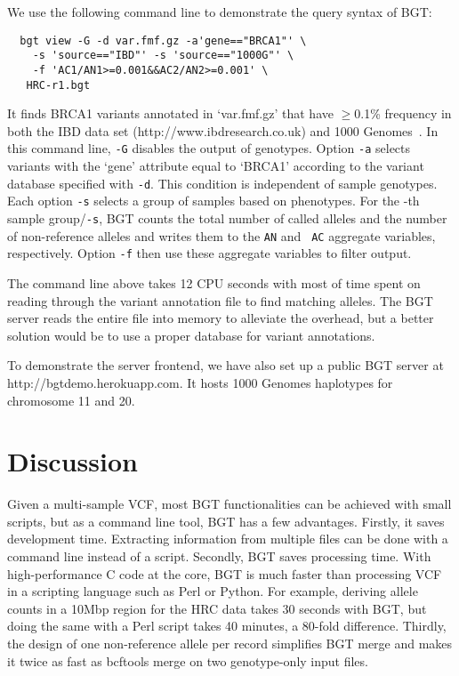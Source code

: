 \documentclass{bioinfo}
\begin{document}
We use the following command line to demonstrate the query syntax of BGT:
\begin{center}\footnotesize
\begin{verbatim}
  bgt view -G -d var.fmf.gz -a'gene=="BRCA1"' \
    -s 'source=="IBD"' -s 'source=="1000G"' \
    -f 'AC1/AN1>=0.001&&AC2/AN2>=0.001' \
   HRC-r1.bgt
\end{verbatim}
\end{center}
It finds BRCA1 variants annotated in `var.fmf.gz' that have $\ge$0.1\%
frequency in both the IBD data set (http://www.ibdresearch.co.uk) and
1000 Genomes~\citep{1000-Genomes-Project-Consortium:2012aa}. In this command line, {\tt -G} disables the output of genotypes.
Option {\tt -a} selects variants with the `gene' attribute equal to `BRCA1'
according to the variant database specified with {\tt -d}. This condition
is independent of sample genotypes. Each option {\tt -s} selects a group of
samples based on phenotypes.  For the -th sample
group/{\tt -s}, BGT counts the total number of called alleles and the number of
non-reference alleles and writes them to the {\tt AN\char35} and {\tt
AC\char35} aggregate variables, respectively. Option {\tt -f} then use these
aggregate variables to filter output.

The command line above takes 12 CPU seconds with most of time spent on reading
through the variant annotation file to find matching alleles. The BGT server
reads the entire file into memory to alleviate the overhead, but a better
solution would be to use a proper database for variant annotations.

To demonstrate the server frontend, we have also set up a public BGT server at
http://bgtdemo.herokuapp.com. It hosts 1000 Genomes haplotypes for chromosome 11 and
20.

\section{Discussion}

Given a multi-sample VCF, most BGT functionalities can be achieved with small
scripts, but as a command line tool, BGT has a few advantages. Firstly, it
saves development time. Extracting information from multiple files can be done
with a command line instead of a script.  Secondly,
BGT saves processing time. With high-performance C code at the core, BGT is
much faster than processing VCF in a scripting language such as Perl or Python.
For example, deriving allele counts in a 10Mbp region for the HRC data takes 30
seconds with BGT, but doing the same with a Perl script takes 40 minutes, a
80-fold difference. Thirdly, the design of one non-reference allele per record
simplifies BGT merge and makes it twice as fast as bcftools merge on two
genotype-only input files.
\end{document}
